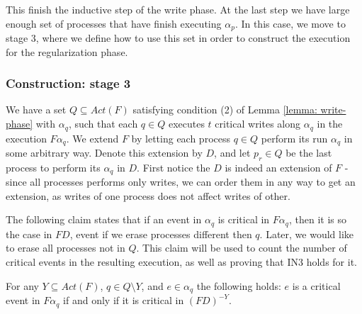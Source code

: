 This finish the inductive step of the write phase. At the last step we have large enough set of processes that have finish executing $\alpha_p$. In this case, we move to stage 3, where we define how to use this set in order to construct the execution for the regularization phase.



\subsubsection{Construction: stage 3}

We have a set $Q \subseteq Act(F)$ satisfying condition (2) of Lemma \ref{lemma: write-phase} with $\alpha_q$, such that each $q \in Q$ executes $t$ critical writes along $\alpha_q$ in the execution $F \alpha_q$.
We extend $F$ by letting each process $q \in Q$ perform its run $\alpha_q$ in some arbitrary way. Denote this extension by $D$, and let $p_r \in Q$ be the last process to perform its $\alpha_q$ in $D$. First notice the $D$ is indeed an extension of $F$ - since all processes performs only writes, we can order them in any way to get an extension, as writes of one process does not affect writes of other.

The following claim states that if an event in $\alpha_q$ is critical in $F \alpha_q$, then it is so the case in $F D$, event if we erase processes different then $q$. Later, we would like to erase all processes not in $Q$. This claim will be used to count the number of critical events in the resulting execution, as well as proving that IN3 holds for it.

\begin{claim-subsection} \label{claim: IN3-write-phase}
	For any $Y \subseteq Act(F)$, $q \in Q \setminus Y$, and $e \in \alpha_q$ the following holds:
	$e$ is a critical event in $F \alpha_q$ if and only if it is critical in $(F D)^{-Y}$.
\end{claim-subsection}

